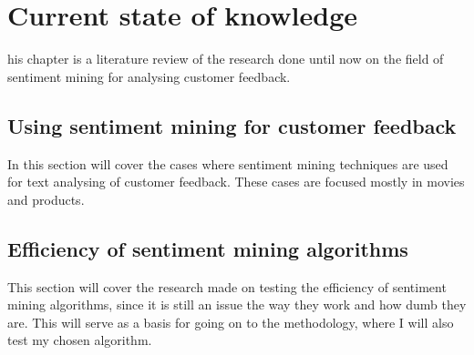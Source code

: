 %
%
\let\textcircled=\pgftextcircled
\chapter{Current state of knowledge}
\label{chap:02}

his chapter is a literature review of the research done until now on the field of sentiment mining for analysing customer feedback.

\section{Using sentiment mining for customer feedback}
In this section will cover the cases where sentiment mining techniques are used for text analysing of customer feedback. These cases are focused mostly in movies and products. 

\section{Efficiency of sentiment mining algorithms}
This section will cover the research made on testing the efficiency of sentiment mining algorithms, since it is still an issue the way they work and how dumb they are. This will serve as a basis for going on to the methodology, where I will also test my chosen algorithm.